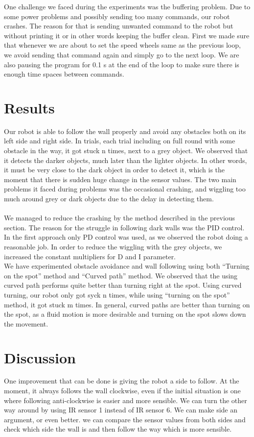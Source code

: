 \documentclass[]{article}
\begin{document}
One challenge we faced during the experiments was the buffering problem. Due to some power problems and possibly sending too many commands, our robot crashes. The reason for that is sending unwanted command to the robot but without printing it or in other words keeping the buffer clean. First we made sure that whenever we are about to set the speed wheels same as the previous loop, we avoid sending that command again and simply go to the next loop. We are also pausing the program for 0.1 s at the end of the loop to make sure there is enough time spaces between commands.    

\section{Results}
Our robot is able to follow the wall properly and avoid any obstacles both on its left side and right side. In trials, each trial including on full round with some obstacle in the way, it got stuck n times, next to a grey object. We observed that it detects the darker objects, much later than the lighter objects. In other words, it must be very close to the dark object in order to detect it, which is the moment that there is sudden huge change in the sensor values. The two main problems it faced during problems was the occasional crashing, and wiggling too much around grey or dark objects due to the delay in detecting them.\\\\

We managed to reduce the crashing by the method described in the previous section. The reason for the struggle in following dark walls was the PID control. In the first approach only PD control was used, as we observed the robot doing a reasonable job. In order to reduce the wiggling with the grey objects, we increased the constant multipliers for D and I parameter. \\
We have experimented obstacle avoidance and wall following using both “Turning on the spot” method and “Curved path” method. We observed that the using curved path performs quite better than turning right at the spot. Using curved turning, our robot only got syck n times, while using “turning on the spot” method, it got stuck m times. In general, curved paths are better than turning on the spot, as a fluid motion is more desirable and turning on the spot slows down the movement.

\section{Discussion}
One improvement that can be done is giving the robot a side to follow. At the moment, it always follows the wall clockwise, even if the initial situation is one where following anti-clockwise is easier and more sensible. We can turn the other way around by using IR sensor 1 instead of IR sensor 6. We can make side an argument, or even better. we can compare the sensor values from both sides and check which side the wall is and then follow the way which is more sensible. \\\\
\end{document}
